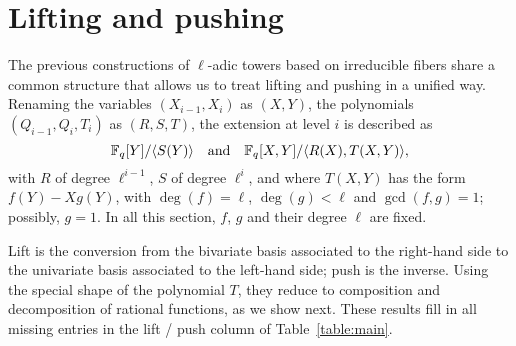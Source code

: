 \documentclass{sig-alternate}
\begin{document}

\section{Lifting and pushing}
\label{sec:lift-push}

The previous constructions of $\ell$-adic towers based on irreducible
fibers share a common structure that allows us to treat lifting and
pushing in a unified way. Renaming the variables $(X_{i-1},X_i)$ as
$(X,Y)$, the polynomials $(Q_{i-1},Q_i,T_i)$ as $(R,S,T)$, the
extension at level $i$ is described as
$$\mathbb{F}_q[Y]/ \langle S(Y) \rangle \quad\text{and}\quad \mathbb{F}_q[X,Y]/\langle
R(X), T(X,Y) \rangle,$$ with $R$ of degree $\ell^{i-1}$, $S$ of degree
$\ell^i$, and where $T(X,Y)$ has the form $f(Y)-X g(Y)$, with $\deg(f)
=\ell$, $\deg(g) < \ell$ and $\gcd(f,g)=1$; possibly, $g=1$. In all
this section, $f$, $g$ and their degree $\ell$ are fixed.


Lift is the conversion from the bivariate basis associated to the
right-hand side to the univariate basis associated to the left-hand side;
push is the inverse. Using the special shape of the polynomial $T$,
they reduce to composition and decomposition of rational functions, as
we show next. These results fill in all missing entries in the lift / push 
column of Table~\ref{table:main}.


\end{document}
